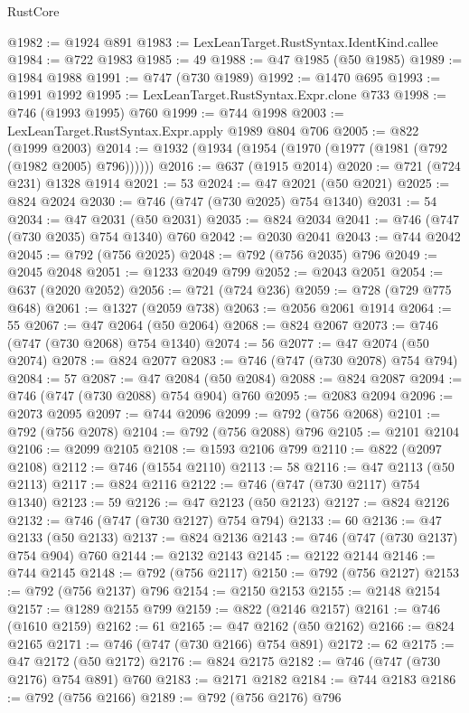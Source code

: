 \begin{lexlean}{RustCore}
\begin{coremodule}
@1982 := @1924 @891
@1983 := LexLeanTarget.RustSyntax.IdentKind.callee
@1984 := @722 @1983
@1985 := 49
@1988 := @47 @1985 (@50 @1985)
@1989 := @1984 @1988
@1991 := @747 (@730 @1989)
@1992 := @1470 @695
@1993 := @1991 @1992
@1995 := LexLeanTarget.RustSyntax.Expr.clone @733
@1998 := @746 (@1993 @1995) @760
@1999 := @744 @1998
@2003 := LexLeanTarget.RustSyntax.Expr.apply @1989 @804 @706
@2005 := @822 (@1999 @2003)
@2014 := @1932 (@1934 (@1954 (@1970 (@1977 (@1981 (@792 (@1982 @2005) @796))))))
@2016 := @637 (@1915 @2014)
@2020 := @721 (@724 @231) @1328 @1914
@2021 := 53
@2024 := @47 @2021 (@50 @2021)
@2025 := @824 @2024
@2030 := @746 (@747 (@730 @2025) @754 @1340)
@2031 := 54
@2034 := @47 @2031 (@50 @2031)
@2035 := @824 @2034
@2041 := @746 (@747 (@730 @2035) @754 @1340) @760
@2042 := @2030 @2041
@2043 := @744 @2042
@2045 := @792 (@756 @2025)
@2048 := @792 (@756 @2035) @796
@2049 := @2045 @2048
@2051 := @1233 @2049 @799
@2052 := @2043 @2051
@2054 := @637 (@2020 @2052)
@2056 := @721 (@724 @236)
@2059 := @728 (@729 @775 @648)
@2061 := @1327 (@2059 @738)
@2063 := @2056 @2061 @1914
@2064 := 55
@2067 := @47 @2064 (@50 @2064)
@2068 := @824 @2067
@2073 := @746 (@747 (@730 @2068) @754 @1340)
@2074 := 56
@2077 := @47 @2074 (@50 @2074)
@2078 := @824 @2077
@2083 := @746 (@747 (@730 @2078) @754 @794)
@2084 := 57
@2087 := @47 @2084 (@50 @2084)
@2088 := @824 @2087
@2094 := @746 (@747 (@730 @2088) @754 @904) @760
@2095 := @2083 @2094
@2096 := @2073 @2095
@2097 := @744 @2096
@2099 := @792 (@756 @2068)
@2101 := @792 (@756 @2078)
@2104 := @792 (@756 @2088) @796
@2105 := @2101 @2104
@2106 := @2099 @2105
@2108 := @1593 @2106 @799
@2110 := @822 (@2097 @2108)
@2112 := @746 (@1554 @2110)
@2113 := 58
@2116 := @47 @2113 (@50 @2113)
@2117 := @824 @2116
@2122 := @746 (@747 (@730 @2117) @754 @1340)
@2123 := 59
@2126 := @47 @2123 (@50 @2123)
@2127 := @824 @2126
@2132 := @746 (@747 (@730 @2127) @754 @794)
@2133 := 60
@2136 := @47 @2133 (@50 @2133)
@2137 := @824 @2136
@2143 := @746 (@747 (@730 @2137) @754 @904) @760
@2144 := @2132 @2143
@2145 := @2122 @2144
@2146 := @744 @2145
@2148 := @792 (@756 @2117)
@2150 := @792 (@756 @2127)
@2153 := @792 (@756 @2137) @796
@2154 := @2150 @2153
@2155 := @2148 @2154
@2157 := @1289 @2155 @799
@2159 := @822 (@2146 @2157)
@2161 := @746 (@1610 @2159)
@2162 := 61
@2165 := @47 @2162 (@50 @2162)
@2166 := @824 @2165
@2171 := @746 (@747 (@730 @2166) @754 @891)
@2172 := 62
@2175 := @47 @2172 (@50 @2172)
@2176 := @824 @2175
@2182 := @746 (@747 (@730 @2176) @754 @891) @760
@2183 := @2171 @2182
@2184 := @744 @2183
@2186 := @792 (@756 @2166)
@2189 := @792 (@756 @2176) @796

\end{coremodule}
\end{lexlean}
